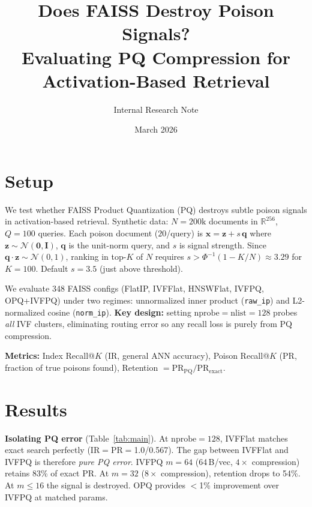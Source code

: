 \documentclass[11pt]{article}
\title{\vspace{-1.5em}Does FAISS Destroy Poison Signals?\\[2pt]
\large Evaluating PQ Compression for Activation-Based Retrieval\vspace{-0.5em}}
\author{Internal Research Note}
\date{March 2026}
\begin{document}
\maketitle
\vspace{-1em}

\section{Setup}

We test whether FAISS Product Quantization (PQ) destroys subtle poison signals in activation-based retrieval.
Synthetic data: $N\!=\!200\text{k}$ documents in $\mathbb{R}^{256}$, $Q\!=\!100$ queries.
Each poison document ($20$/query) is $\mathbf{x} = \mathbf{z} + s\,\mathbf{q}$ where $\mathbf{z}\!\sim\!\mathcal{N}(\mathbf{0},\mathbf{I})$, $\mathbf{q}$ is the unit-norm query, and $s$ is signal strength.
Since $\mathbf{q}\!\cdot\!\mathbf{z}\!\sim\!\mathcal{N}(0,1)$, ranking in top-$K$ of $N$ requires $s > \Phi^{-1}(1\!-\!K/N) \approx 3.29$ for $K\!=\!100$.
Default $s\!=\!3.5$ (just above threshold).

We evaluate 348 FAISS configs (FlatIP, IVFFlat, HNSWFlat, IVFPQ, OPQ+IVFPQ) under two regimes: unnormalized inner product (\texttt{raw\_ip}) and L2-normalized cosine (\texttt{norm\_ip}).
\textbf{Key design:} setting $\text{nprobe}\!=\!\text{nlist}\!=\!128$ probes \emph{all} IVF clusters, eliminating routing error so any recall loss is purely from PQ compression.

\textbf{Metrics:} Index Recall@$K$ (IR, general ANN accuracy), Poison Recall@$K$ (PR, fraction of true poisons found), Retention $= \text{PR}_\text{PQ}/\text{PR}_\text{exact}$.

\section{Results}

\textbf{Isolating PQ error} (Table~\ref{tab:main}).
At $\text{nprobe}\!=\!128$, IVFFlat matches exact search perfectly (IR$=$PR$=$1.0/0.567).
The gap between IVFFlat and IVFPQ is therefore \emph{pure PQ error}.
IVFPQ $m\!=\!64$ (64\,B/vec, $4\times$ compression) retains 83\% of exact PR.
At $m\!=\!32$ ($8\times$ compression), retention drops to 54\%.
At $m\!\leq\!16$ the signal is destroyed.
OPQ provides $<$1\% improvement over IVFPQ at matched params.
\end{document}
